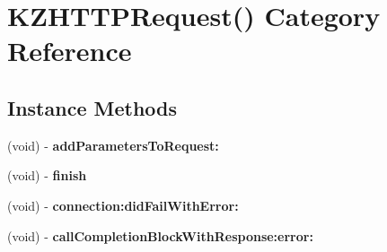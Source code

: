 \hypertarget{category_k_z_h_t_t_p_request_07_08}{\section{K\-Z\-H\-T\-T\-P\-Request() Category Reference}
\label{category_k_z_h_t_t_p_request_07_08}
}
\subsection*{Instance Methods}
\begin{DoxyCompactItemize}
\item 
\hypertarget{category_k_z_h_t_t_p_request_07_08_aa3f6c2b267fa408046d2b3cc6d482596}{(void) -\/ {\bfseries add\-Parameters\-To\-Request\-:}}\label{category_k_z_h_t_t_p_request_07_08_aa3f6c2b267fa408046d2b3cc6d482596}

\item 
\hypertarget{category_k_z_h_t_t_p_request_07_08_acd3daac2e3373b860ae05b9ef271a31f}{(void) -\/ {\bfseries finish}}\label{category_k_z_h_t_t_p_request_07_08_acd3daac2e3373b860ae05b9ef271a31f}

\item 
\hypertarget{category_k_z_h_t_t_p_request_07_08_a743d74330d22d112d6e7ad1bfa10de61}{(void) -\/ {\bfseries connection\-:did\-Fail\-With\-Error\-:}}\label{category_k_z_h_t_t_p_request_07_08_a743d74330d22d112d6e7ad1bfa10de61}

\item 
\hypertarget{category_k_z_h_t_t_p_request_07_08_a44666449fe7d3bcbb39da93359d2ab8c}{(void) -\/ {\bfseries call\-Completion\-Block\-With\-Response\-:error\-:}}\label{category_k_z_h_t_t_p_request_07_08_a44666449fe7d3bcbb39da93359d2ab8c}

\end{DoxyCompactItemize}
